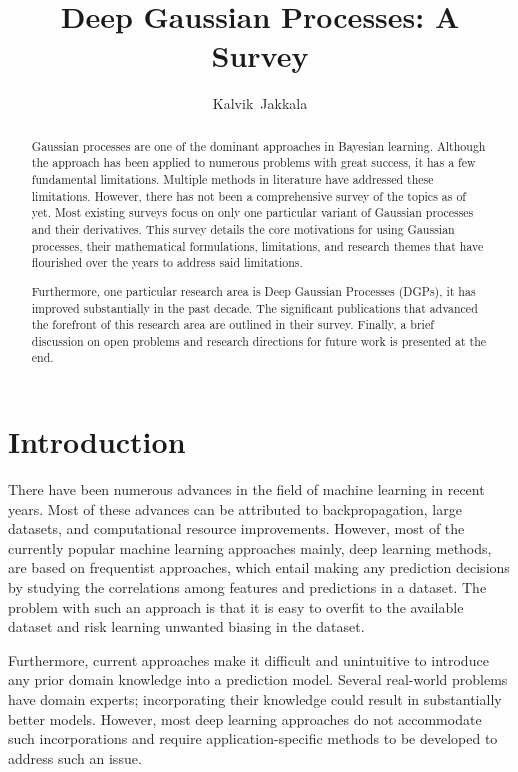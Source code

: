 \documentclass[letterpaper,11pt]{extarticle}
\title{Deep Gaussian Processes: A Survey}
\begin{document}
\author{Kalvik~Jakkala}

\maketitle

\begin{abstract}
Gaussian processes are one of the dominant approaches in Bayesian learning. Although the approach has been applied to numerous problems with great success, it has a few fundamental limitations. Multiple methods in literature have addressed these limitations. However, there has not been a comprehensive survey of the topics as of yet. Most existing surveys focus on only one particular variant of Gaussian processes and their derivatives. This survey details the core motivations for using  Gaussian processes, their mathematical formulations, limitations, and research themes that have flourished over the years to address said limitations.

Furthermore, one particular research area is Deep Gaussian Processes (DGPs), it has improved substantially in the past decade. The significant publications that advanced the forefront of this research area are outlined in their survey. Finally, a brief discussion on open problems and research directions for future work is presented at the end. 
\end{abstract}


\section{Introduction}
There have been numerous advances in the field of machine learning in recent years. Most of these advances can be attributed to backpropagation, large datasets, and computational resource improvements. However, most of the currently popular machine learning approaches mainly, deep learning methods, are based on frequentist approaches, which entail making any prediction decisions by studying the correlations among features and predictions in a dataset. The problem with such an approach is that it is easy to overfit to the available dataset and risk learning unwanted biasing in the dataset. 

Furthermore, current approaches make it difficult and unintuitive to introduce any prior domain knowledge into a prediction model. Several real-world problems have domain experts; incorporating their knowledge could result in substantially better models. However, most deep learning approaches do not accommodate such incorporations and require application-specific methods to be developed to address such an issue.
\end{document}
